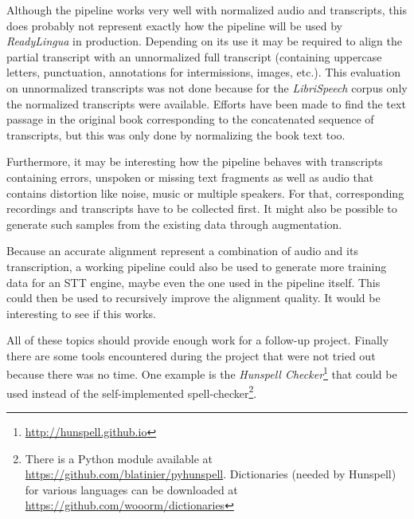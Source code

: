 Although the pipeline works very well with normalized audio and transcripts, this does probably not represent exactly how the pipeline will be used by \textit{ReadyLingua} in production. Depending on its use it may be required to align the partial transcript with an unnormalized full transcript (containing uppercase letters, punctuation, annotations for intermissions, images, etc.). This evaluation on unnormalized transcripts was not done because for the \textit{LibriSpeech} corpus only the normalized transcripts were available. Efforts have been made to find the text passage in the original book corresponding to the concatenated sequence of transcripts, but this was only done by normalizing the book text too.

Furthermore, it may be interesting how the pipeline behaves with transcripts containing errors, unspoken or missing text fragments as well as audio that contains distortion like noise, music or multiple speakers. For that, corresponding recordings and transcripts have to be collected first. It might also be possible to generate such samples from the existing data through augmentation.

Because an accurate alignment represent a combination of audio and its transcription, a working pipeline could also be used to generate more training data for an \ac{STT} engine, maybe even the one used in the pipeline itself. This could then be used to recursively improve the alignment quality. It would be interesting to see if this works.

All of these topics should provide enough work for a follow-up project. Finally there are some tools encountered during the project that were not tried out because there was no time. One example is the \textit{Hunspell Checker}\footnote{\url{http://hunspell.github.io}} that could be used instead of the self-implemented spell-checker\footnote{There is a Python module available at \url{https://github.com/blatinier/pyhunspell}. Dictionaries (needed by Hunspell) for various languages can be downloaded at \url{https://github.com/wooorm/dictionaries}}.